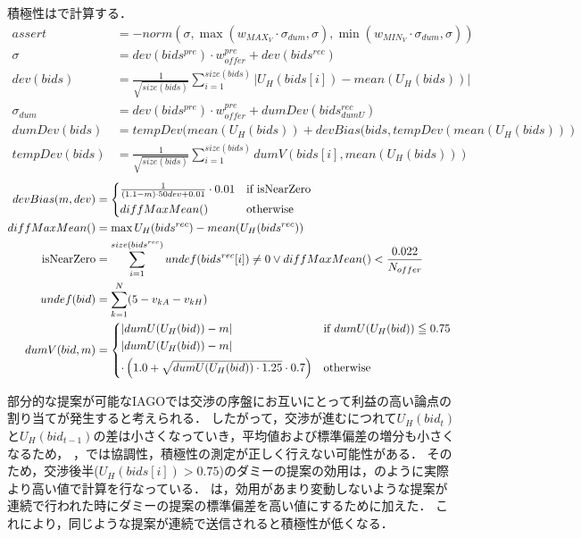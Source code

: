積極性はで計算する．
\begin{align}
    assert &= -norm(\sigma, \max (w_{MAX_V} \cdot \sigma_{dum}, \sigma), \min (w_{MIN_V} \cdot \sigma_{dum}, \sigma)) \label{eq:assertiveness} \\
    \sigma &= dev(bids^{pre}) \cdot w_{offer}^{pre} + dev(bids^{rec}) \nonumber \\
    dev(bids) &= \frac{1}{\sqrt{size(bids)}}\sum_{i = 1}^{size(bids)} |U_H(bids[i]) - mean(U_H(bids))| \nonumber \\
    \sigma_{dum} &= dev(bids^{pre}) \cdot w_{offer}^{pre} + dumDev(bids_{dumU}^{rec}) \nonumber \\
    dumDev(bids) &= tempDev(mean(U_H(bids)) + devBias(bids, tempDev(mean(U_H(bids))) \nonumber \\
    tempDev(bids) &= \frac{1}{\sqrt{size(bids)}}\sum_{i = 1}^{size(bids)} dumV(bids[i], mean(U_H(bids))) \nonumber 
\end{align}
\begin{align}
    devBias(m, dev) &= 
    \begin{cases*}
        \frac{1}{(1.1 - m) \cdot 50dev + 0.01} \cdot 0.01 & if isNearZero \\
        diffMaxMean() & otherwise 
    \end{cases*} \label{eq:devBias} \\
    diffMaxMean() &= \max U_H(bids^{rec}) - mean(U_H(bids^{rec})) \nonumber \\
    {\rm isNearZero} &= \sum_{i = 1}^{size(bids^{rec})}undef(bids^{rec}[i]) \neq 0 \vee diffMaxMean() < \frac{0.022}{N_{offer}} \nonumber \\
    undef(bid) &= \sum_{k = 1}^{N} (5 - v_{kA} - v_{kH}) \nonumber \\
    dumV(bid, m) &=
    \begin{cases*}
        |dumU(U_H(bid)) - m| & if $dumU(U_H(bid)) \leqq 0.75$ \\
        |dumU(U_H(bid)) - m| \\
        \cdot \left( 1.0 + \sqrt{dumU(U_H(bid)) \cdot 1.25} \cdot 0.7 \right) & otherwise 
    \end{cases*} \label{eq:dummyV}
\end{align}

部分的な提案が可能なIAGOでは交渉の序盤にお互いにとって利益の高い論点の割り当てが発生すると考えられる．
したがって，交渉が進むにつれて$U_H(bid_t)$と$U_H(bid_{t-1})$の差は小さくなっていき，平均値および標準偏差の増分も小さくなるため，
，では協調性，積極性の測定が正しく行えない可能性がある．
そのため，交渉後半($U_H(bids[i]) > 0.75$)のダミーの提案の効用は，のように実際より高い値で計算を行なっている．
は，効用があまり変動しないような提案が連続で行われた時にダミーの提案の標準偏差を高い値にするために加えた．
これにより，同じような提案が連続で送信されると積極性が低くなる．

